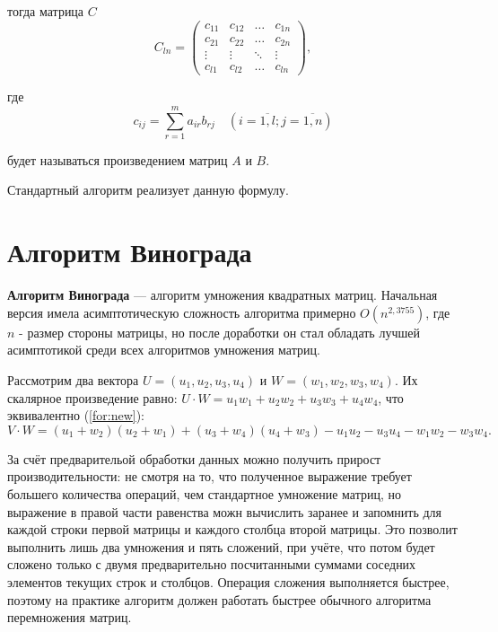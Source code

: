 тогда матрица $C$
\begin{equation}
	C_{ln} = \begin{pmatrix}
		c_{11} & c_{12} & \ldots & c_{1n}\\
		c_{21} & c_{22} & \ldots & c_{2n}\\
		\vdots & \vdots & \ddots & \vdots\\
		c_{l1} & c_{l2} & \ldots & c_{ln}
	\end{pmatrix},
\end{equation}

где
\begin{equation}
	\label{eq:M}
	c_{ij} =
	\sum_{r=1}^{m} a_{ir}b_{rj} \quad (i=\overline{1,l}; j=\overline{1,n})
\end{equation}

будет называться произведением матриц $A$ и $B$.

Стандартный алгоритм реализует данную формулу.


\section{Алгоритм Винограда}

\textbf{Алгоритм Винограда} \cite{vinograd-matrix} — алгоритм умножения квадратных матриц. Начальная версия имела асимптотическую сложность алгоритма примерно $O(n^{2,3755})$, где $n$ - размер стороны матрицы, но после доработки он стал обладать лучшей асимптотикой среди всех алгоритмов умножения матриц.

Рассмотрим два вектора $U = (u_1, u_2, u_3, u_4)$ и $W = (w_1, w_2, w_3, w_4)$.
Их скалярное произведение равно: $U \cdot W = u_1w_1 + u_2w_2 + u_3w_3 + u_4w_4$, что эквивалентно (\ref{for:new}):
\begin{equation}
	\label{for:new}
	V \cdot W = (u_1 + w_2)(u_2 + w_1) + (u_3 + w_4)(u_4 + w_3) - u_1u_2 - u_3u_4 - w_1w_2 - w_3w_4.
\end{equation}

За счёт предварительой обработки данных можно получить прирост производительности: не смотря на то, что  полученное выражение требует большего количества операций, чем стандартное умножение матриц, но выражение в правой части равенства можн вычислить заранее и запомнить для каждой строки первой матрицы и каждого столбца второй матрицы. Это позволит выполнить лишь два умножения и пять сложений, при учёте, что потом будет сложено только с двумя предварительно посчитанными суммами соседних элементов текущих строк и столбцов. Операция сложения выполняется быстрее, поэтому на практике алгоритм должен работать быстрее обычного алгоритма перемножения матриц.

